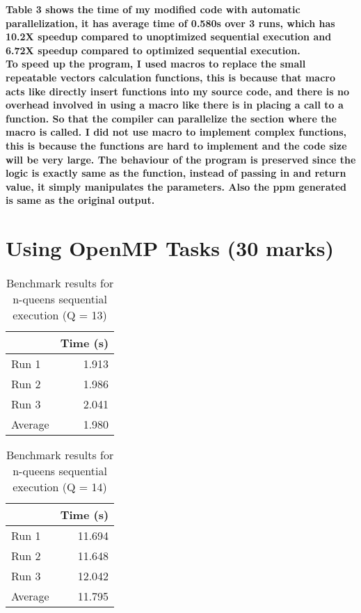 \documentclass[12pt]{article}
\begin{document}
{\bf Table 3 shows the time of my modified code with automatic parallelization, it has average time of 0.580s over 3 runs, which has 10.2X speedup compared to unoptimized sequential execution and 6.72X speedup compared to optimized sequential execution.
}
\\
{\bf To speed up the program, I used macros to replace the small repeatable vectors calculation functions, this is because that macro acts like directly insert functions into my source code, and there is no overhead involved in using a macro like there is in placing a call to a function. So that the compiler can parallelize the section where the macro is called. I did not use macro to implement complex functions, this is because the functions are hard to implement and the code size will be very large. The behaviour of the program is preserved since the logic is exactly same as the function, instead of passing in and return value, it simply manipulates the parameters. Also the ppm generated is same as the original output.}

\section*{Using OpenMP Tasks (30 marks)}

\begin{table}[H]
  \centering
  \begin{tabular}{lr}
    & {\bf Time (s)} \\
    \hline
    Run 1 & 1.913 \\
    Run 2 & 1.986 \\
    Run 3 & 2.041  \\
    \hline
    Average & 1.980 \\
  \end{tabular}
  \caption{Benchmark results for n-queens sequential execution  (Q = 13)}
  \label{tbl-fib-sequential}
\end{table}

\begin{table}[H]
  \centering
  \begin{tabular}{lr}
    & {\bf Time (s)} \\
    \hline
    Run 1 & 11.694 \\
    Run 2 & 11.648 \\
    Run 3 & 12.042 \\
    \hline
    Average & 11.795 \\
  \end{tabular}
  \caption{Benchmark results for n-queens sequential execution  (Q = 14)}
  \label{tbl-fib-tasks}
\end{table}
\end{document}
